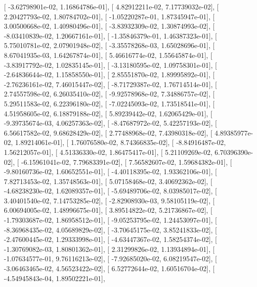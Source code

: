 \documentclass{article}
\begin{document}
       [ -3.62798901e-02,   1.16864786e-01],
       [  4.82912211e-02,   7.17739032e-02],
       [  2.20427793e-02,   1.80784702e-01],
       [ -1.05220287e-01,   1.87345947e-01],
       [  3.00500668e-02,   1.40980496e-01],
       [ -3.83932309e-02,   1.30874993e-02],
       [ -8.03410839e-02,   1.20667161e-01],
       [ -1.35846379e-01,   1.46387323e-01],
       [  5.75010781e-02,   2.07901948e-02],
       [ -3.35578268e-03,   1.65028696e-01],
       [  8.67041935e-03,   1.64267874e-01],
       [  5.46616774e-02,   1.55645874e-01],
       [ -3.83917792e-02,   1.02835145e-01],
       [ -3.13180595e-02,   1.09758301e-01],
       [ -2.64836644e-02,   1.15858550e-01],
       [  2.85551870e-02,   1.89995892e-01],
       [ -2.76236161e-02,   7.46015447e-02],
       [ -8.71729387e-02,   1.76714514e-01],
       [  2.74557598e-02,   6.26035410e-02],
       [ -9.92578968e-02,   7.34886757e-02],
       [  5.29511583e-02,   6.22396180e-02],
       [ -7.02245093e-02,   1.73518541e-01],
       [  4.51958605e-02,   6.18879188e-02],
       [  5.89239442e-02,   1.62065429e-01],
       [ -9.39735674e-03,   4.06257363e-02],
       [ -8.47687972e-02,   5.42257193e-02],
       [  6.56617582e-02,   9.68628429e-02],
       [  2.77488968e-02,   7.43980318e-02],
       [  4.89385977e-02,   1.89214061e-01],
       [  1.76076580e-02,   8.74366835e-02],
       [ -8.84916487e-02,   1.56212057e-01],
       [  4.51336330e-02,   1.86475417e-01],
       [  5.21109269e-02,   6.70396390e-02],
       [ -6.15961041e-02,   7.79683391e-02],
       [  7.56582607e-02,   1.59684382e-01],
       [ -9.80160736e-02,   1.60652551e-01],
       [ -4.40118395e-02,   1.93362106e-01],
       [  7.82713453e-02,   1.35748563e-01],
       [  5.07158468e-02,   3.40692362e-02],
       [ -4.68238230e-02,   1.62089357e-01],
       [ -5.69489706e-02,   8.03985017e-02],
       [  3.40401540e-02,   7.14753285e-02],
       [ -2.82908930e-03,   9.58105119e-02],
       [  6.00694005e-02,   1.48996675e-01],
       [  3.89514822e-02,   5.21736867e-02],
       [ -1.79303687e-02,   1.86958512e-01],
       [ -9.05253795e-02,   1.24453097e-01],
       [ -8.36968435e-02,   4.05689829e-02],
       [ -3.70645175e-02,   3.85241833e-02],
       [ -2.47600445e-02,   1.29333998e-01],
       [ -4.63447367e-02,   1.58254374e-02],
       [ -1.30769082e-03,   1.80801362e-01],
       [  2.31299826e-02,   1.13934894e-01],
       [ -1.07634577e-01,   9.76116213e-02],
       [ -7.92685020e-02,   6.08219547e-02],
       [ -3.06463465e-02,   4.56523422e-02],
       [  6.52772644e-02,   1.60516704e-02],
       [ -4.54945843e-04,   1.89502221e-01],
\end{document}
